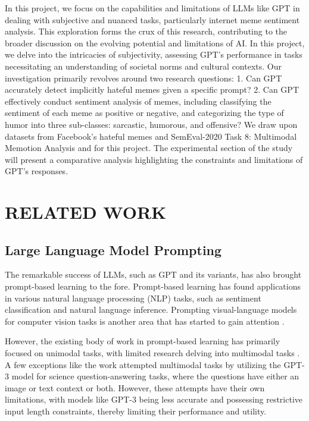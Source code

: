\documentclass[conference]{IEEEtran}
\begin{document}
In this project, we focus on the capabilities and limitations of LLMs like GPT in dealing with subjective and nuanced tasks, particularly internet meme sentiment analysis. This exploration forms the crux of this research, contributing to the broader discussion on the evolving potential and limitations of AI. In this project, we delve into the intricacies of subjectivity, assessing GPT's performance in tasks necessitating an understanding of societal norms and cultural contexts. Our investigation primarily revolves around two research questions: 1. Can GPT accurately detect implicitly hateful memes given a specific prompt? 2. Can GPT effectively conduct sentiment analysis of memes, including classifying the sentiment of each meme as positive or negative, and categorizing the type of humor into three sub-classes: sarcastic, humorous, and offensive?  We draw upon datasets from  Facebook's hateful memes \cite{kiela2020hateful} and SemEval-2020 Task 8: Multimodal Memotion Analysis \cite{sharma2020semeval} and for this project. The experimental section of the study will present a comparative analysis highlighting the constraints and limitations of GPT's responses.


\section{RELATED WORK}

\subsection{Large Language Model Prompting}

The remarkable success of LLMs, such as GPT and its variants, has also brought prompt-based learning to the fore. Prompt-based learning has found applications in various natural language processing (NLP) tasks, such as sentiment classification and natural language inference. Prompting visual-language models for computer vision tasks is another area that has started to gain attention \cite{radford2021learning, zhou2022conditional}.

However, the existing body of work in prompt-based learning has primarily focused on unimodal tasks, with limited research delving into multimodal tasks \cite{zeng2022socratic, uppal2022multimodal}. A few exceptions like the work \cite{lu2022learn} attempted multimodal tasks by utilizing the GPT-3 model \cite{brown2020language} for science question-answering tasks, where the questions have either an image or text context or both. However, these attempts have their own limitations, with models like GPT-3 being less accurate and possessing restrictive input length constraints, thereby limiting their performance and utility.
\end{document}

